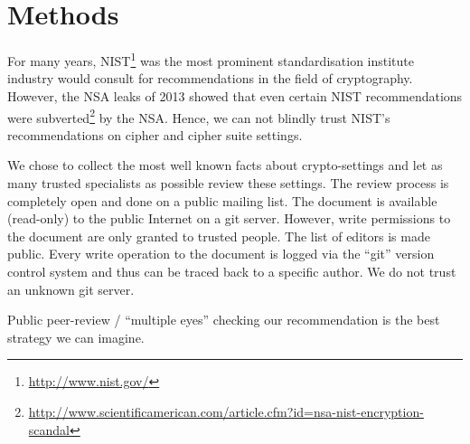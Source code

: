 \section{Methods}

For many years, NIST\footnote{\url{http://www.nist.gov/}} was the most prominent
standardisation institute industry would consult for recommendations in the
field of cryptography. However, the NSA leaks of 2013 showed that even certain
NIST recommendations were
subverted\footnote{\url{http://www.scientificamerican.com/article.cfm?id=nsa-nist-encryption-scandal}}
by the NSA.  Hence, we can not blindly trust NIST's recommendations on cipher
and cipher suite settings. 

We chose to collect the most well known facts about crypto-settings and let as
many trusted specialists as possible review these settings.  The review process
is completely open and done on a public mailing list. The document is available
(read-only) to the public Internet on a git server. However, write permissions
to the document are only granted to trusted people. The list of editors is made public.
Every write operation to the document is logged via the ``git'' version
control system and thus can be traced back to a specific author.  We do not
trust an unknown git server. 

Public peer-review / ``multiple eyes'' checking our recommendation is the best
strategy we can imagine.



